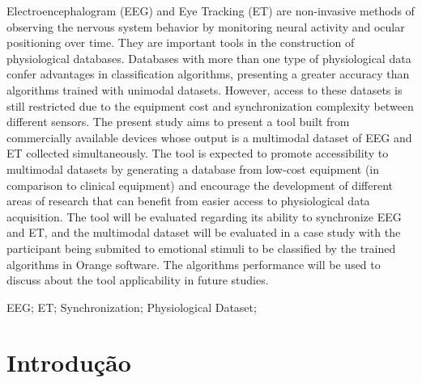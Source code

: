 \documentclass[a4paper, 12pt]{ppgeb}
\begin{document}
Electroencephalogram (EEG) and Eye Tracking (ET) are non-invasive methods of observing the nervous system behavior 
by monitoring neural activity and ocular positioning over time. They are important tools in the construction of physiological 
databases. Databases with more than one type of physiological data confer advantages in classification algorithms, 
presenting a greater accuracy than algorithms trained with unimodal datasets. However, access to these datasets is still restricted
 due to the equipment cost and synchronization complexity between different sensors. The present study aims to present a tool built 
 from commercially available devices whose output is a multimodal dataset of EEG and ET collected simultaneously. 
 The tool is expected to promote accessibility to multimodal datasets by generating a database from
low-cost equipment (in comparison to clinical equipment) and encourage the development of different areas of research 
that can benefit from easier access to physiological data acquisition. The tool will be evaluated regarding its ability 
to synchronize EEG and ET, and the multimodal dataset will be evaluated in a case study with the participant being submited to emotional 
stimuli to be classified by the trained algorithms in Orange software. The algorithms performance will be used to discuss about the 
tool applicability in future studies.

\vspace{14pt}

 EEG; ET; Synchronization; Physiological Dataset;
\acresetall %
\indice

\begin{center}

{\bfseries{} } %
\end{center}


\clearpage


\acresetall %

\chapter{Introdução}
\end{document}

